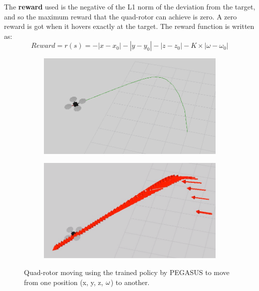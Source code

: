 \documentclass[hidelinks,BTech]{iitmdiss}
\begin{document}
The {\bf reward} used is the negative of the L1 norm of the deviation from the target, and so the maximum reward that the quad-rotor can achieve is zero. A zero reward is got when it hovers exactly at the target. The reward function is written as:
\begin{equation}
  Reward = r(s) = - |x - x_0| - |y - y_0| - |z - z_0| - K \times |\omega - \omega_0|
\end{equation}

\begin{figure}[H]
  \centering
    \begin{subfigure}[t]{0.45\textwidth}
      \centering
        \includegraphics[width=\textwidth]{quadrotor_position_control.png}
    \end{subfigure}
    \begin{subfigure}[t]{0.45\textwidth}
      \centering
        \includegraphics[width=\textwidth]{quadrotor_position_control2.png}
    \end{subfigure}
    \caption{Quad-rotor moving using the trained policy by PEGASUS to move from one position (x, y, z, $\protect\omega$) to another.}
\end{figure}
\end{document}
